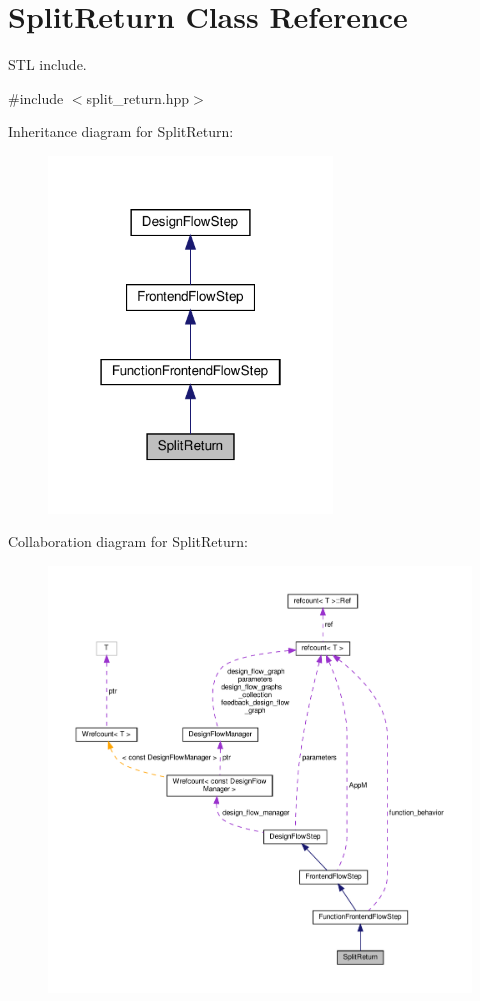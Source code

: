\hypertarget{classSplitReturn}{}\section{Split\+Return Class Reference}
\label{classSplitReturn}


S\+TL include.  




{\ttfamily \#include $<$split\+\_\+return.\+hpp$>$}



Inheritance diagram for Split\+Return\+:
\nopagebreak
\begin{figure}[H]
\begin{center}
\leavevmode
\includegraphics[width=214pt]{da/db0/classSplitReturn__inherit__graph}
\end{center}
\end{figure}


Collaboration diagram for Split\+Return\+:
\nopagebreak
\begin{figure}[H]
\begin{center}
\leavevmode
\includegraphics[width=350pt]{db/d46/classSplitReturn__coll__graph}
\end{center}
\end{figure}
